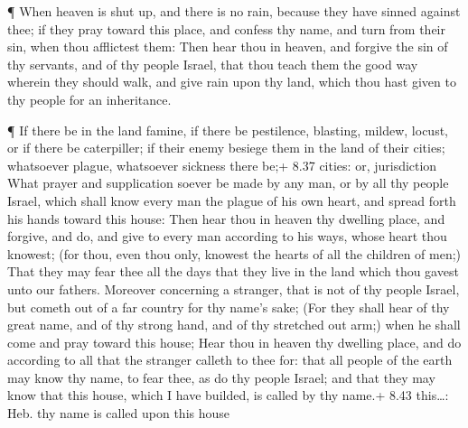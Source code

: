  ¶ When heaven is shut up, and there is no rain, because
they have sinned against thee; if they pray toward this place, and
confess thy name, and turn from their sin, when thou afflictest them:
 Then hear thou in heaven, and forgive the sin of thy
servants, and of thy people Israel, that thou teach them the good way
wherein they should walk, and give rain upon thy land, which thou hast
given to thy people for an inheritance.

 ¶ If there be in the land famine, if there be pestilence,
blasting, mildew, locust, or if there be caterpiller; if their enemy
besiege them in the land of their cities; whatsoever plague, whatsoever
sickness there be;+ 8.37 cities: or, jurisdiction  What
prayer and supplication soever be made by any man, or by all thy people
Israel, which shall know every man the plague of his own heart, and
spread forth his hands toward this house:  Then hear thou
in heaven thy dwelling place, and forgive, and do, and give to every man
according to his ways, whose heart thou knowest; (for thou, even thou
only, knowest the hearts of all the children of men;)  That
they may fear thee all the days that they live in the land which thou
gavest unto our fathers.  Moreover concerning a stranger,
that is not of thy people Israel, but cometh out of a far country for
thy name's sake;  (For they shall hear of thy great name,
and of thy strong hand, and of thy stretched out arm;) when he shall
come and pray toward this house;  Hear thou in heaven thy
dwelling place, and do according to all that the stranger calleth to
thee for: that all people of the earth may know thy name, to fear thee,
as do thy people Israel; and that they may know that this house, which I
have builded, is called by thy name.+ 8.43 this\ldots: Heb. thy name is
called upon this house

